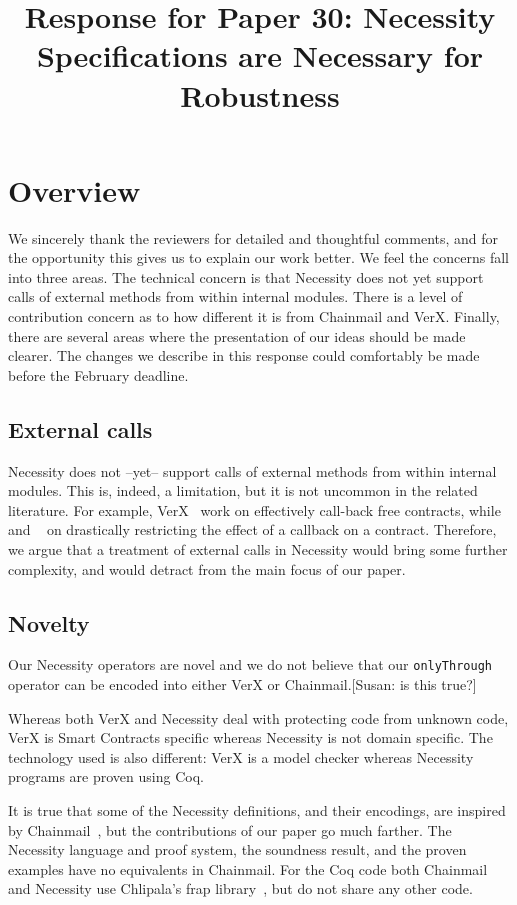 \documentclass[11pt]{amsart}
\title{Response for Paper 30: Necessity Specifications are Necessary for Robustness }
\begin{document}
\maketitle
\section{Overview}
We sincerely thank the reviewers for detailed and thoughtful comments, and for the opportunity this gives us to explain our work better. We feel the concerns fall into three areas. The technical concern is that Necessity does not yet support calls of external methods from within internal modules. There is a level of contribution concern as to how different it is from Chainmail and VerX. Finally, there are several areas where the presentation of our ideas should be made clearer. The changes we describe in this response could comfortably be made before the February deadline.

\subsection*{External calls}

Necessity does not --yet-- support calls of external methods from within internal modules. This is, indeed, a limitation, but it is not uncommon in the related literature. For example, VerX~\citep{Permenev} work on effectively call-back free contracts, while~\citep{Grossman} and ~\citep{Albert} on drastically restricting the effect of a callback on a contract. Therefore, we argue that a treatment of  external calls in Necessity would bring some further complexity, and would  detract from the main focus of our paper.  

\subsection*{Novelty}

Our Necessity operators are novel and we do not believe that our {\tt{onlyThrough}} operator can be encoded into either VerX or Chainmail.[Susan: is this true?]

Whereas both VerX and Necessity deal with protecting code from unknown code, VerX is Smart Contracts specific whereas Necessity is not domain specific.  The technology used is also different: VerX is a model checker whereas Necessity programs are proven using Coq.

It is true that some of the Necessity definitions, and their encodings, are inspired by Chainmail~\citep{Drossopoulou}, 
but the contributions of our paper go much farther.
The Necessity language and proof system, 
the soundness result, and the proven examples have no equivalents in Chainmail.
For the Coq code both Chainmail and Necessity use Chlipala's frap library~\citep{Chlipala}, but do not share any other code.
\end{document}
